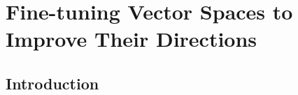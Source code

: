 \chapter{Fine-tuning Vector Spaces to Improve Their Directions}\label{ch3}


\section{Introduction}





